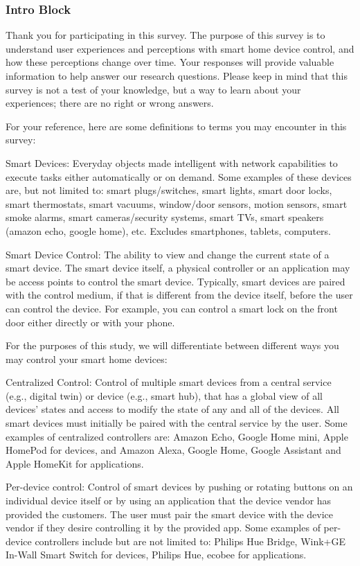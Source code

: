 \subsubsection{Intro Block}
\label{appdx:survey:intro}
Thank you for participating in this survey. The purpose of this survey is to understand user experiences and perceptions with smart home device control, and how these perceptions change over time. Your responses will provide valuable information to help answer our research questions. Please keep in mind that this survey is not a test of your knowledge, but a way to learn about your experiences; there are no right or wrong answers.

For your reference, here are some definitions to terms you may encounter in this survey:
 
Smart Devices: Everyday objects made intelligent with network capabilities to execute tasks either automatically or on demand. Some examples of these devices are, but not limited to: smart plugs/switches, smart lights, smart door locks, smart thermostats, smart vacuums, window/door sensors, motion sensors, smart smoke alarms, smart cameras/security systems, smart TVs, smart speakers (amazon echo, google home), etc. Excludes smartphones, tablets, computers.
 
Smart Device Control: The ability to view and change the current state of a smart device. The smart device itself, a physical controller or an application may be access points to control the smart device. Typically, smart devices are paired with the control medium, if that is different from the device itself, before the user can control the device. For example, you can control a smart lock on the front door either directly or with your phone. 

For the purposes of this study, we will differentiate between different ways you may control your smart home devices:

Centralized Control: Control of multiple smart devices from a central service (e.g., digital twin) or device (e.g.,  smart hub), that has a global view of all devices' states and access to modify the state of any and all of the devices. All smart devices must initially be paired with the central service by the user. Some examples of centralized controllers are: Amazon Echo, Google Home mini, Apple HomePod for devices, and Amazon Alexa, Google Home, Google Assistant and Apple HomeKit for applications.

Per-device control: Control of smart devices by pushing or rotating buttons on an individual device itself or by using an application that the device vendor has provided the customers. The user must pair the smart device with the device vendor if they desire controlling it by the provided app. Some examples of per-device controllers include but are not limited to: Philips Hue Bridge, Wink+GE In-Wall Smart Switch for devices, Philips Hue, ecobee for applications.

